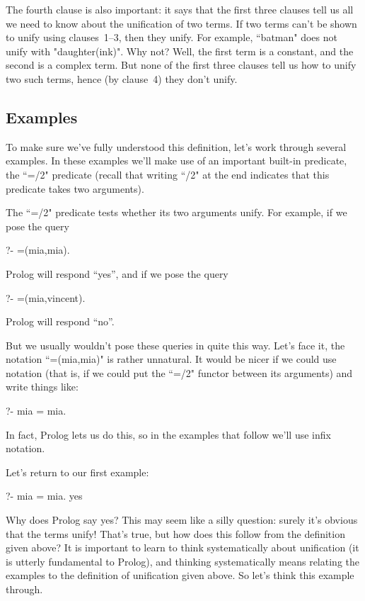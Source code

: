 The fourth clause is also important: it says that the first three
clauses tell us all we need to know about the unification of two
terms. If two terms can't be shown to unify using clauses~1--3, then
they  unify. For example, ``batman" does not unify with
"daughter(ink)". Why not? Well, the first term is a constant, and the
second is a complex term.  But none of the first three clauses tell us
how to unify two such terms, hence (by clause~4) they don't unify.


\subsection*{Examples}\label{SUBSEC.L2.EXAMPLES}


To make sure we've fully understood this definition, let's work
through several examples.  In these examples we'll make use of an
important built-in predicate, the ``=/2" predicate (recall that
writing ``/2" at the end indicates that
this predicate takes two arguments).


The ``=/2" predicate tests whether its two arguments
unify. For example, if we pose the query
%
\begin{LPNcodedisplay}
?- =(mia,mia).
\end{LPNcodedisplay}
%
Prolog will respond ``yes'', and if we pose the query
\begin{LPNcodedisplay}
?- =(mia,vincent).
\end{LPNcodedisplay}
%
Prolog will respond ``no''.

But we usually wouldn't pose these queries in quite this way.  Let's
face it, the notation ``=(mia,mia)" is rather unnatural. It would be
nicer if we could use  notation (that is, if we could
put the ``=/2" functor between its arguments) and write things like:
%
\begin{LPNcodedisplay}
?- mia = mia.
\end{LPNcodedisplay}
In fact, Prolog lets us do this, so in the examples that follow we'll
use infix notation.

Let's return to our first example:
%
\begin{LPNcodedisplay}
?- mia = mia.
yes
\end{LPNcodedisplay}
%

Why does Prolog say yes? This may seem like a silly question: surely
it's obvious that the terms unify! That's true, but how does this
follow from the definition given above? It is important to learn to
think systematically about unification (it is utterly fundamental to
Prolog), and thinking systematically means relating the examples
to the definition of unification given above. So let's think this
example through.

